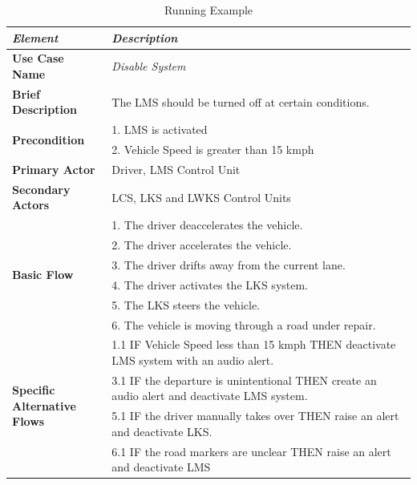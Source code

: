 \begin{table}[htbp]
  \centering
  \caption{Running Example}
    \begin{adjustbox}{width=1\textwidth}
    \begin{tabular}{|l|l|l|l|l|l|l|l|}
    \toprule
    \textit{\textbf{Element}} & \multicolumn{7}{l|}{\textit{\textbf{ Description}}} \\
    \midrule
    \textbf{Use Case Name} & \multicolumn{7}{l|}{\textit{Disable System}} \\
    \midrule
    \textbf{Brief Description } & \multicolumn{7}{l|}{The LMS should be turned off at certain conditions.} \\
    \midrule
    \multirow{2}[4]{*}{\textbf{Precondition}} & \multicolumn{7}{l|}{1. LMS is activated} \\
\cmidrule{2-8}          & \multicolumn{7}{l|}{2. Vehicle Speed is greater than 15 kmph} \\
    \midrule
    \textbf{Primary Actor } & \multicolumn{7}{l|}{Driver, LMS Control Unit} \\
    \midrule
    \textbf{Secondary Actors} & \multicolumn{7}{l|}{LCS, LKS and LWKS Control Units} \\
    \midrule
    \multirow{6}[12]{*}{\textbf{Basic Flow}} & \multicolumn{7}{l|}{1. The driver deaccelerates the vehicle.} \\
\cmidrule{2-8}          & \multicolumn{7}{l|}{2. The driver accelerates the vehicle.} \\
\cmidrule{2-8}          & \multicolumn{7}{l|}{3. The driver drifts away from the current lane.} \\
\cmidrule{2-8}          & \multicolumn{7}{l|}{4. The driver activates the LKS system.} \\
\cmidrule{2-8}          & \multicolumn{7}{l|}{5. The LKS steers the vehicle.} \\
\cmidrule{2-8}          & \multicolumn{7}{l|}{6. The vehicle is moving through a road under repair.} \\
    \midrule
    \multicolumn{1}{|l|}{\multirow{4}[8]{*}{\textbf{Specific \newline{} Alternative Flows}}} & \multicolumn{7}{l|}{1.1 IF Vehicle Speed less than 15 kmph THEN deactivate LMS system with an audio alert.} \\
\cmidrule{2-8}          & \multicolumn{7}{l|}{3.1 IF the departure is unintentional THEN create an audio alert and deactivate LMS system.} \\
\cmidrule{2-8}          & \multicolumn{7}{l|}{5.1 IF the driver manually takes over THEN raise an alert and deactivate LKS.} \\
\cmidrule{2-8}          & \multicolumn{7}{l|}{6.1 IF the road markers are unclear THEN raise an alert and deactivate LMS} \\
    \bottomrule
    \bottomrule
    \end{tabular}%
    \end{adjustbox}
  \label{tab:runningexample}%
\end{table}%


